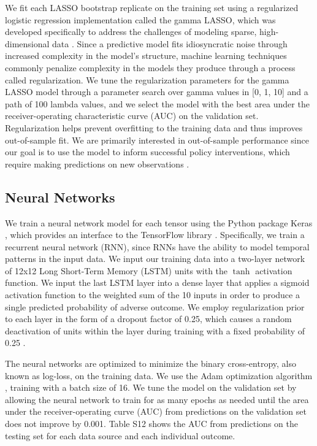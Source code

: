 \documentclass[9pt,twoside]{pnas-new}
\begin{document}
We fit each LASSO bootstrap replicate on the training set using a regularized logistic regression implementation called the gamma LASSO, which was developed specifically to address the challenges of modeling sparse, high-dimensional data \cite{taddy}. Since a predictive model fits idiosyncratic noise through increased complexity in the model's structure, machine learning techniques commonly penalize complexity in the models they produce through a process called regularization. We tune the regularization parameters for the gamma LASSO model through a parameter search over gamma values in [0, 1, 10] and a path of 100 lambda values, and we select the model with the best area under the receiver-operating characteristic curve (AUC) on the validation set. Regularization helps prevent overfitting to the training data and thus improves out-of-sample fit. We are primarily interested in out-of-sample performance since our goal is to use the model to inform successful policy interventions, which require making predictions on new observations \cite{kleinberg}.

\subsection{Neural Networks}

We train a neural network model for each tensor using the Python package Keras \cite{chollet}, which provides an interface to the TensorFlow library \cite{abadi}. Specifically, we train a recurrent neural network (RNN), since RNNs have the ability to model temporal patterns in the input data. We input our training data into a two-layer network of 12x12 Long Short-Term Memory (LSTM) \cite{hochreiter} units with the $\tanh$ activation function. We input the last LSTM layer into a dense layer that applies a sigmoid activation function to the weighted sum of the 10 inputs in order to produce a single predicted probability of adverse outcome. We employ regularization prior to each layer in the form of a dropout factor of 0.25, which causes a random deactivation of units within the layer during training with a fixed probability of 0.25 \cite{srivastava}.

The neural networks are optimized to minimize the binary cross-entropy, also known as log-loss, on the training data. We use the Adam optimization algorithm \cite{kingma}, training with a batch size of 16. We tune the model on the validation set by allowing the neural network to train for as many epochs as needed until the area under the receiver-operating curve (AUC) from predictions on the validation set does not improve by 0.001. Table S12 shows the AUC from predictions on the testing set for each data source and each individual outcome.
\end{document}
